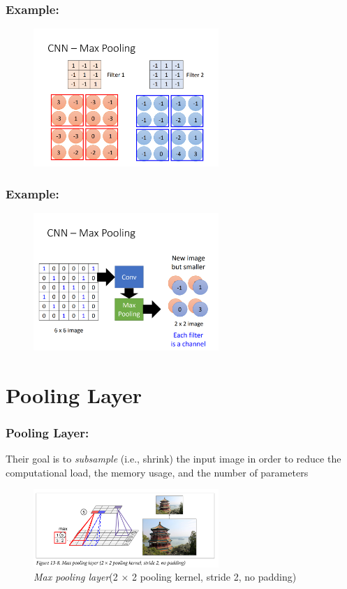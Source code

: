 \documentclass{beamer}
\begin{document}
    \begin{frame}
    \frametitle{Example: }
        \begin{figure}[H]
            \begin{center}
                \includegraphics[width=7cm]{ppt8}
            \end{center}
        \end{figure}
    \end{frame}
    \begin{frame}
    \frametitle{Example: }
        \begin{figure}[H]
            \begin{center}
                \includegraphics[width=7cm]{ppt9}
            \end{center}
        \end{figure}
    \end{frame} 
\section{Pooling Layer}
    \begin{frame}
    \frametitle{Pooling Layer: }
        Their  goal  is  to  \emph{subsample}  (i.e.,  shrink)  the  input  image  in  order  to
        reduce  the  computational  load,  the  memory  usage,  and  the  number  of  parameters
    \begin{figure}[H]
            \begin{center}
                \includegraphics[width=7cm]{FIGURE13-8}
            \end{center}
        \caption{\emph{Max pooling layer}(2 × 2 pooling kernel, stride 2, no padding)}
        \end{figure}
    \end{frame}
\end{document}
